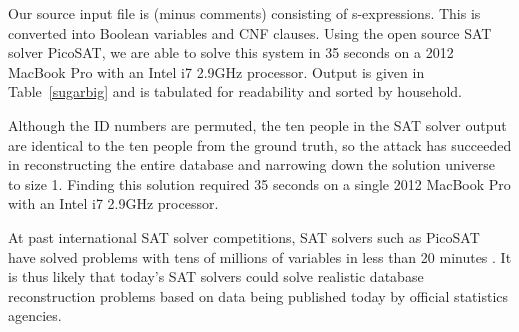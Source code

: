 \documentclass[runningheads]{llncs}
\begin{document}
Our source input file is \NumConstraintLines{} (minus comments)
consisting of \NumSExpressions s-expressions. This is converted into
\NumVariables Boolean variables and \NumClauses CNF clauses. Using the
open source SAT solver PicoSAT\cite{Biere_picosatessentials}, we are able
to solve this system in 35 seconds on a 2012 MacBook Pro with an Intel
i7 2.9GHz processor. Output is given in Table~\ref{sugarbig} and is
tabulated for readability and sorted by household.

Although the ID numbers are permuted, the ten people in the SAT
solver output are identical to the ten people from the ground truth, so the attack has succeeded in reconstructing
the entire database and narrowing down the solution universe to size
1. Finding this solution required 35 seconds on a single 2012 MacBook
Pro with an Intel i7 2.9GHz processor.

At past international SAT
solver competitions, SAT solvers such as PicoSAT have solved problems
with tens of millions of variables in less than 20 minutes
\cite{satcomp}. It is thus likely that today's SAT solvers could solve
realistic database reconstruction problems based on data being
published today by official statistics agencies.
\end{document}
